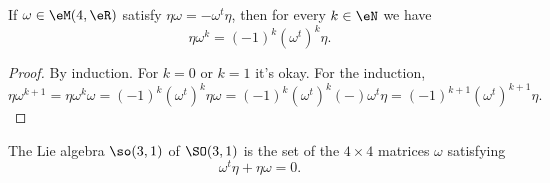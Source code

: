 \begin{lemma}       \label{LEMooEEDYooKuRxbW}
	If \( \omega\in \eM(4,\eR)\) satisfy \( \eta\omega=-\omega^t\eta\), then for every \( k\in \eN\) we have
	\begin{equation}
		\eta\omega^k=(-1)^k(\omega^t)^k\eta.
	\end{equation}
\end{lemma}

\begin{proof}
	By induction. For \( k=0\) or \( k=1\) it's okay. For the induction,
	\begin{equation}
		\eta\omega^{k+1}=\eta\omega^k\omega=(-1)^k(\omega^t)^k\eta\omega=(-1)^k(\omega^t)^k(-)\omega^t\eta=(-1)^{k+1}(\omega^t)^{k+1}\eta.
	\end{equation}
\end{proof}

\begin{proposition}        \label{PROPooGNHJooKILwuI}
	The Lie algebra \( \so(3,1)\) of \( \SO(3,1)\) is the set of the \( 4\times 4\) matrices \( \omega\) satisfying
	\begin{equation}
		\omega^t\eta+\eta\omega=0.
	\end{equation}
\end{proposition}


